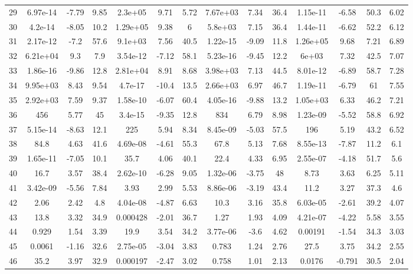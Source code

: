 \begin{longtable}{lccccccccccccc}
29 & 6.97e-14 & -7.79 & 9.85 & 2.3e+05 & 9.71 & 5.72 & 7.67e+03 & 7.34 & 36.4 & 1.15e-11 & -6.58 & 50.3 & 6.02\\
30 & 4.2e-14 & -8.05 & 10.2 & 1.29e+05 & 9.38 & 6 & 5.8e+03 & 7.15 & 36.4 & 1.44e-11 & -6.62 & 52.2 & 6.12\\
31 & 2.17e-12 & -7.2 & 57.6 & 9.1e+03 & 7.56 & 40.5 & 1.22e-15 & -9.09 & 11.8 & 1.26e+05 & 9.68 & 7.21 & 6.89\\
32 & 6.21e+04 & 9.3 & 7.9 & 3.54e-12 & -7.12 & 58.1 & 5.23e-16 & -9.45 & 12.2 & 6e+03 & 7.32 & 42.5 & 7.07\\
33 & 1.86e-16 & -9.86 & 12.8 & 2.81e+04 & 8.91 & 8.68 & 3.98e+03 & 7.13 & 44.5 & 8.01e-12 & -6.89 & 58.7 & 7.28\\
34 & 9.95e+03 & 8.43 & 9.54 & 4.7e-17 & -10.4 & 13.5 & 2.66e+03 & 6.97 & 46.7 & 1.19e-11 & -6.79 & 61 & 7.55\\
35 & 2.92e+03 & 7.59 & 9.37 & 1.58e-10 & -6.07 & 60.4 & 4.05e-16 & -9.88 & 13.2 & 1.05e+03 & 6.33 & 46.2 & 7.21\\
36 & 456 & 5.77 & 45 & 3.4e-15 & -9.35 & 12.8 & 834 & 6.79 & 8.98 & 1.23e-09 & -5.52 & 58.8 & 6.92\\
37 & 5.15e-14 & -8.63 & 12.1 & 225 & 5.94 & 8.34 & 8.45e-09 & -5.03 & 57.5 & 196 & 5.19 & 43.2 & 6.52\\
38 & 84.8 & 4.63 & 41.6 & 4.69e-08 & -4.61 & 55.3 & 67.8 & 5.13 & 7.68 & 8.55e-13 & -7.87 & 11.2 & 6.1\\
39 & 1.65e-11 & -7.05 & 10.1 & 35.7 & 4.06 & 40.1 & 22.4 & 4.33 & 6.95 & 2.55e-07 & -4.18 & 51.7 & 5.6\\
40 & 16.7 & 3.57 & 38.4 & 2.62e-10 & -6.28 & 9.05 & 1.32e-06 & -3.75 & 48 & 8.73 & 3.63 & 6.25 & 5.11\\
41 & 3.42e-09 & -5.56 & 7.84 & 3.93 & 2.99 & 5.53 & 8.86e-06 & -3.19 & 43.4 & 11.2 & 3.27 & 37.3 & 4.6\\
42 & 2.06 & 2.42 & 4.8 & 4.04e-08 & -4.87 & 6.63 & 10.3 & 3.16 & 35.8 & 6.03e-05 & -2.61 & 39.2 & 4.07\\
43 & 13.8 & 3.32 & 34.9 & 0.000428 & -2.01 & 36.7 & 1.27 & 1.93 & 4.09 & 4.21e-07 & -4.22 & 5.58 & 3.55\\
44 & 0.929 & 1.54 & 3.39 & 19.9 & 3.54 & 34.2 & 3.77e-06 & -3.6 & 4.62 & 0.00191 & -1.54 & 34.3 & 3.03\\
45 & 0.0061 & -1.16 & 32.6 & 2.75e-05 & -3.04 & 3.83 & 0.783 & 1.24 & 2.76 & 27.5 & 3.75 & 34.2 & 2.55\\
46 & 35.2 & 3.97 & 32.9 & 0.000197 & -2.47 & 3.02 & 0.758 & 1.01 & 2.13 & 0.0176 & -0.791 & 30.5 & 2.04\\

\end{longtable}

